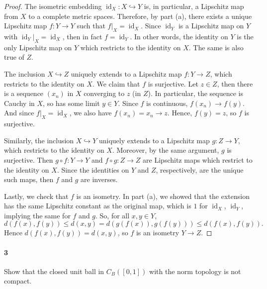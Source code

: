 \documentclass[12pt]{article}
\newlength{\myparskip}
\newenvironment{fullbox}{\begin{lrbox}{\savefullbox}\begin{minipage}{\dimexpr\textwidth-2\fboxsep\relax}\setlength{\parskip}{\myparskip}}{\end{minipage}\end{lrbox}\framebox[\textwidth]{\usebox{\savefullbox}}}
\newenvironment{pbox}[1][]{\begin{fullbox}\ifx#1\empty\else\paragraph{#1}\fi}{\end{fullbox}}
\newcommand{\<}{\langle}
\renewcommand{\>}{\rangle}
\DeclareMathOperator{\id}{id}
\begin{document}
\begin{proof}
    The isometric embedding $\id_X : X \hookrightarrow Y$ is, in particular, a Lipschitz map from $X$ to a complete metric spaces. Therefore, by part (a), there exists a unique Lipschitz map $f : Y \to Y$ such that $f|_X = \id_X$. Since $\id_Y$ is a Lipschitz map on $Y$ with $\id_Y|_X = \id_X$, then in fact $f = \id_Y$. In other words, the identity on $Y$ is the only Lipschitz map on $Y$ which restricts to the identity on $X$. The same is also true of $Z$.

    The inclusion $X \hookrightarrow Z$ uniquely extends to a Lipschitz map $f : Y \to Z$, which restricts to the identity on $X$. We claim that $f$ is surjective. Let $z \in Z$, then there is a sequence $(x_n)$ in $X$ converging to $z$ (in $Z$). In particular, the sequence is Cauchy in $X$, so has some limit $y \in Y$. Since $f$ is continuous, $f(x_n) \to f(y)$. And since $f|_X = \id_X$, we also have $f(x_n) = x_n \to z$. Hence, $f(y) = z$, so $f$ is surjective.

    Similarly, the inclusion $X \hookrightarrow Y$ uniquely extends to a Lipschitz map $g : Z \to Y$, which restricts to the identity on $X$. Moreover, by the same argument, $g$ is surjective. Then $g \circ f : Y \to Y$ and $f \circ g : Z \to Z$ are Lipschitz maps which restrict to the identity on $X$. Since the identities on $Y$ and $Z$, respectively, are the unique such maps, then $f$ and $g$ are inverses.

    Lastly, we check that $f$ is an isometry. In part (a), we showed that the extension has the same Lipschitz constant as the original map, which is $1$ for $\id_X$, $\id_Y$, implying the same for $f$ and $g$. So, for all $x, y \in Y$,
    \[
        d(f(x), f(y))
            \leq d(x, y)
            = d(g(f(x)), g(f(y)))
            \leq d(f(x), f(y)).
    \]
    Hence $d(f(x), f(y)) = d(x, y)$, so $f$ is an isometry $Y \to Z$.

\end{proof}


\newpage
\begin{pbox}[3]
    Show that the closed unit ball in $C_B([0,1])$ with the norm topology is not compact.
\end{pbox}
\end{document}

